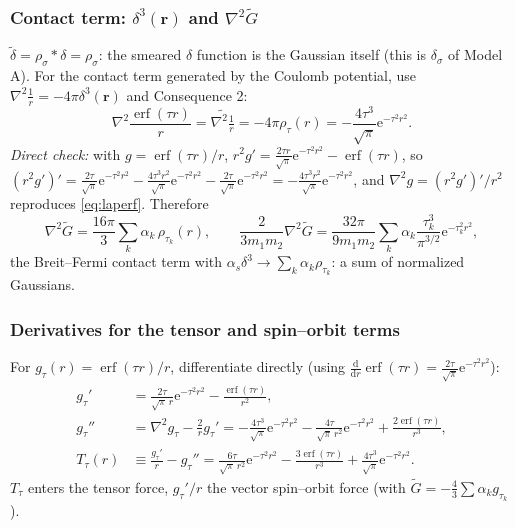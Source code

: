\documentclass[11pt,a4paper]{article}
\numberwithin{equation}{section}
\theoremstyle{definition}
\theoremstyle{plain}
\theoremstyle{remark}
\numberwithin{algorithm}{section}
\newcommand{\vr}{\bm r}
\newcommand{\as}{\alpha_s}
\newcommand{\dd}{\mathrm{d}}
\newcommand{\ee}{\mathrm{e}}
\newcommand{\erf}{\operatorname{erf}}
\begin{document}
\subsubsection{\texorpdfstring{Contact term: $\delta^3(\vr)$ and $\nabla^2\tilde G$}{Contact term}}\label{sec:smdelta}
$\tilde\delta=\rho_\sigma*\delta=\rho_\sigma$: the smeared $\delta$ function is the Gaussian itself (this is $\delta_\sigma$ of Model A).
For the contact term generated by the Coulomb potential, use $\nabla^2\frac1r=-4\pi\delta^3(\vr)$ and Consequence 2:
\begin{equation}
\nabla^2\frac{\erf(\tau r)}{r}=\widetilde{\nabla^2\tfrac1r}=-4\pi\rho_\tau(r)=-\frac{4\tau^3}{\sqrt\pi}\ee^{-\tau^2r^2}.
\label{eq:laperf}
\end{equation}
\emph{Direct check:} with $g=\erf(\tau r)/r$, $r^2g'=\frac{2\tau r}{\sqrt\pi}\ee^{-\tau^2r^2}-\erf(\tau r)$, so
$(r^2g')'=\frac{2\tau}{\sqrt\pi}\ee^{-\tau^2r^2}-\frac{4\tau^3r^2}{\sqrt\pi}\ee^{-\tau^2r^2}-\frac{2\tau}{\sqrt\pi}\ee^{-\tau^2r^2}=-\frac{4\tau^3r^2}{\sqrt\pi}\ee^{-\tau^2r^2}$, and $\nabla^2g=(r^2g')'/r^2$ reproduces \eqref{eq:laperf}. Therefore
\begin{equation}
\nabla^2\tilde G=\frac{16\pi}{3}\sum_k\alpha_k\,\rho_{\tau_k}(r),\qquad
\frac{2}{3m_1m_2}\nabla^2\tilde G=\frac{32\pi}{9m_1m_2}\sum_k\alpha_k\frac{\tau_k^3}{\pi^{3/2}}\ee^{-\tau_k^2r^2},
\end{equation}
the Breit--Fermi contact term with $\as\delta^3\to\sum_k\alpha_k\rho_{\tau_k}$: a sum of normalized Gaussians.

\subsubsection{Derivatives for the tensor and spin--orbit terms}
For $g_\tau(r)=\erf(\tau r)/r$, differentiate directly (using $\frac{\dd}{\dd r}\erf(\tau r)=\frac{2\tau}{\sqrt\pi}\ee^{-\tau^2r^2}$):
\begin{align}
g_\tau'&=\frac{2\tau}{\sqrt\pi\,r}\ee^{-\tau^2r^2}-\frac{\erf(\tau r)}{r^2},\\
g_\tau''&=\nabla^2g_\tau-\frac2rg_\tau'=-\frac{4\tau^3}{\sqrt\pi}\ee^{-\tau^2r^2}-\frac{4\tau}{\sqrt\pi\,r^2}\ee^{-\tau^2r^2}+\frac{2\erf(\tau r)}{r^3},\\
T_\tau(r)&\equiv\frac{g_\tau'}{r}-g_\tau''=\frac{6\tau}{\sqrt\pi\,r^2}\ee^{-\tau^2r^2}-\frac{3\erf(\tau r)}{r^3}+\frac{4\tau^3}{\sqrt\pi}\ee^{-\tau^2r^2}.
\label{eq:Ttau}
\end{align}
$T_\tau$ enters the tensor force, $g_\tau'/r$ the vector spin--orbit force (with $\tilde G=-\frac43\sum\alpha_kg_{\tau_k}$).
\end{document}
